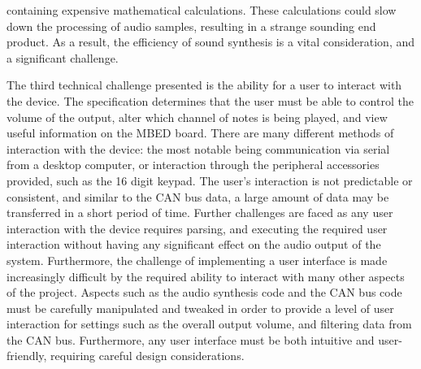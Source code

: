 containing expensive mathematical calculations. 
These calculations could slow down the processing of audio samples, resulting in
a strange sounding end product. As a result, the efficiency of sound synthesis is 
a vital consideration, and a significant challenge. 
\par\bigskip\noindent
The third technical challenge presented is the ability for a user 
to interact with the device.
The specification determines that the user must be able to control 
the volume of the output, alter which channel of notes is being played, 
and view useful information on the MBED board. 
There are many different methods of interaction with the device: the most 
notable being communication via serial from a desktop computer, or interaction 
through the peripheral accessories provided, such as the 16 digit keypad. 
The user's interaction is not predictable or consistent, and similar to the CAN 
bus data, a large amount of data may be transferred in a short period of time. 
Further challenges are faced as any user interaction with the device requires 
parsing, and executing the required user interaction without having any 
significant effect on the audio output of the system.
Furthermore, the challenge of implementing a user interface is made increasingly 
difficult by the required ability to interact with many other aspects of the 
project. 
Aspects such as the audio synthesis code and the CAN bus code must be carefully 
manipulated and tweaked in order to provide a level of user interaction for 
settings such as the overall output volume, and filtering data from the CAN bus. 
Furthermore, any user interface must be both intuitive and user-friendly, requiring
careful design considerations. 
